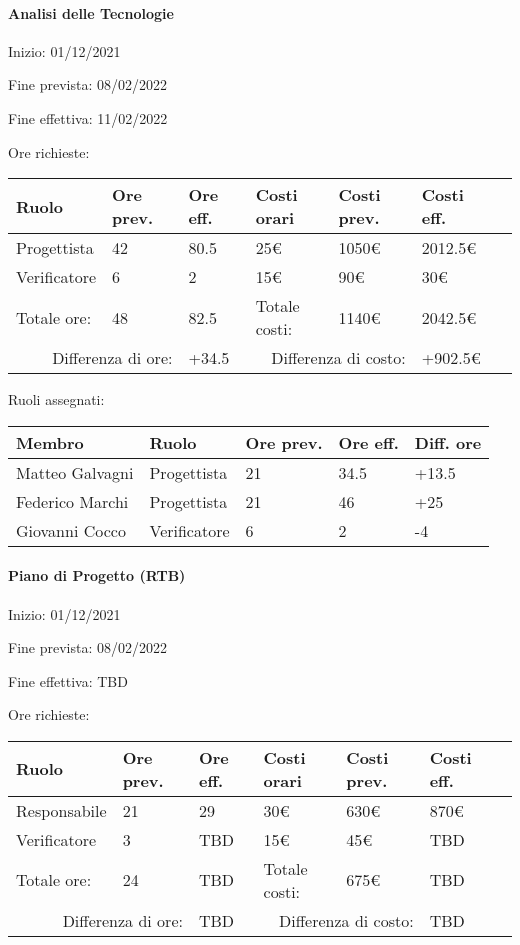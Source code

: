 \documentclass[a4paper, 12pt]{article}
\begin{document}
\paragraph{Analisi delle Tecnologie}
Inizio: 01/12/2021\par
Fine prevista: 08/02/2022\par
Fine effettiva: 11/02/2022

Ore richieste:\\[0.5em]
\begin{tabular}{|l|l|l||l|l|l|l|}\hline
Ruolo & Ore prev. & Ore eff. & Costi orari & Costi prev. & Costi eff.\\\hline
Progettista & 42 & 80.5 & 25\euro & 1050\euro & 2012.5\euro \\\hline
Verificatore & 6 & 2 & 15\euro & 90\euro & 30\euro \\\hline
Totale ore: & 48 & 82.5 & Totale costi: & 1140\euro & 2042.5\euro \\\hline
\multicolumn{2}{|r|}{Differenza di ore:} & +34.5 & \multicolumn{2}{r|}{Differenza di costo:} & +902.5\euro \\\hline
\end{tabular}

Ruoli assegnati:\\[0.5em]
\begin{tabular}{|l|l|l|l|l|}\hline
Membro & Ruolo & Ore prev. & Ore eff. & Diff. ore \\\hline
Matteo Galvagni & Progettista & 21 & 34.5 & +13.5 \\\hline
Federico Marchi & Progettista & 21 & 46 & +25 \\\hline
Giovanni Cocco & Verificatore & 6 & 2 & -4 \\\hline
\end{tabular}

\paragraph{Piano di Progetto (RTB)}
Inizio: 01/12/2021\par
Fine prevista: 08/02/2022\par
Fine effettiva: TBD

Ore richieste:\\[0.5em]
\begin{tabular}{|l|l|l||l|l|l|l|}\hline
Ruolo & Ore prev. & Ore eff. & Costi orari & Costi prev. & Costi eff.\\\hline
Responsabile & 21 & 29 & 30\euro & 630\euro & 870\euro \\\hline
Verificatore & 3 & TBD & 15\euro & 45\euro & TBD \\\hline
Totale ore: & 24 & TBD & Totale costi: & 675\euro & TBD \\\hline
\multicolumn{2}{|r|}{Differenza di ore:} & TBD & \multicolumn{2}{r|}{Differenza di costo:} & TBD \\\hline
\end{tabular}
\end{document}
